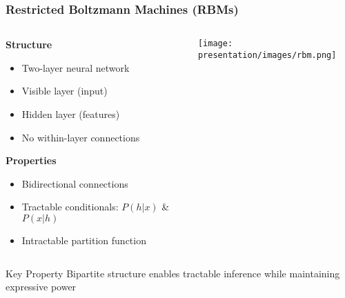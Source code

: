 \documentclass{beamer}
\begin{document}
\begin{frame}[fragile]
\frametitle{Restricted Boltzmann Machines (RBMs)}
\begin{columns}
    \begin{column}{0.55\textwidth}
        \textbf{Structure}
        \begin{itemize}
        \item Two-layer neural network
        \item Visible layer (input)
        \item Hidden layer (features)
        \item No within-layer connections
        \end{itemize}
        \pause
        
        \textbf{Properties}
        \begin{itemize}
        \item Bidirectional connections
        \item Tractable conditionals: $P(h|x)$ \& $P(x|h)$
        \item Intractable partition function
        \end{itemize}
    \end{column}
    \pause
    
    \begin{column}{0.45\textwidth}
        \texttt{[image: presentation/images/rbm.png]}
    \end{column}
\end{columns}

\begin{alertblock}{Key Property}
Bipartite structure enables tractable inference while maintaining expressive power
\end{alertblock}
\end{frame}
\end{document}

